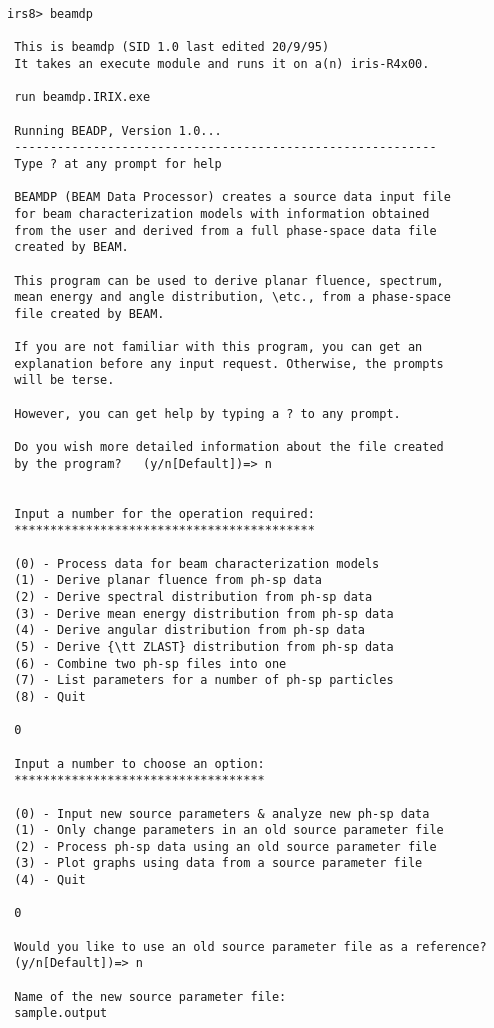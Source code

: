 \documentclass[12pt,twoside]{article}
\newcommand{\etc}{{\em etc}}
\begin{document}
\begin{verbatim}
irs8> beamdp

 This is beamdp (SID 1.0 last edited 20/9/95)
 It takes an execute module and runs it on a(n) iris-R4x00.

 run beamdp.IRIX.exe

 Running BEADP, Version 1.0...
 -----------------------------------------------------------
 Type ? at any prompt for help

 BEAMDP (BEAM Data Processor) creates a source data input file
 for beam characterization models with information obtained
 from the user and derived from a full phase-space data file
 created by BEAM.

 This program can be used to derive planar fluence, spectrum,
 mean energy and angle distribution, \etc., from a phase-space
 file created by BEAM.

 If you are not familiar with this program, you can get an
 explanation before any input request. Otherwise, the prompts
 will be terse.

 However, you can get help by typing a ? to any prompt.

 Do you wish more detailed information about the file created
 by the program?   (y/n[Default])=> n


 Input a number for the operation required:
 ******************************************

 (0) - Process data for beam characterization models
 (1) - Derive planar fluence from ph-sp data
 (2) - Derive spectral distribution from ph-sp data
 (3) - Derive mean energy distribution from ph-sp data
 (4) - Derive angular distribution from ph-sp data
 (5) - Derive {\tt ZLAST} distribution from ph-sp data
 (6) - Combine two ph-sp files into one
 (7) - List parameters for a number of ph-sp particles
 (8) - Quit

 0

 Input a number to choose an option:
 ***********************************

 (0) - Input new source parameters & analyze new ph-sp data
 (1) - Only change parameters in an old source parameter file
 (2) - Process ph-sp data using an old source parameter file
 (3) - Plot graphs using data from a source parameter file
 (4) - Quit

 0

 Would you like to use an old source parameter file as a reference?
 (y/n[Default])=> n

 Name of the new source parameter file:
 sample.output


\end{verbatim}
\end{document}
